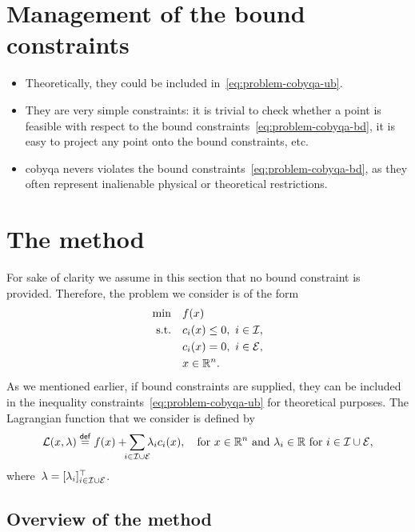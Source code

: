 \section{Management of the bound constraints}

\begin{itemize}
    \item Theoretically, they could be included in~\cref{eq:problem-cobyqa-ub}.
    \item They are very simple constraints: it is trivial to check whether a point is feasible with respect to the bound constraints~\cref{eq:problem-cobyqa-bd}, it is easy to project any point onto the bound constraints, etc.
    \item \gls{cobyqa} nevers violates the bound constraints~\cref{eq:problem-cobyqa-bd}, as they often represent inalienable physical or theoretical restrictions.
\end{itemize}

\section{The  method}

For sake of clarity we assume in this section that no bound constraint is provided.
Therefore, the problem we consider is of the form
\begin{subequations}
    \label{eq:problem-cobyqa-no-bounds}
    \begin{align}
        \min        & \quad f(x)\\
        \text{s.t.} & \quad c_{i}(x) \le 0, ~ i \in \mathcal{I},\\
                    & \quad c_{i}(x) = 0, ~ i \in \mathcal{E},\\
                    & \quad x \in \mathbb{R}^n. \nonumber
    \end{align}
\end{subequations}
As we mentioned earlier, if bound constraints are supplied, they can be included in the inequality constraints~\cref{eq:problem-cobyqa-ub} for theoretical purposes.
The Lagrangian function that we consider is defined by
\begin{equation*}
    \lag(x, \lambda) \eqdef \obj(x) + \sum_{\mathclap{i \in \iub \cup \ieq}} \lambda_i \con{i}(x), \quad \text{for~$x \in \R^n$ and~$\lambda_i \in \R$ for~$i \in \iub \cup \ieq$},
\end{equation*}
where~$\lambda = [\lambda_i]_{i \in \mathcal{I} \cup \mathcal{E}}^{\top}$.

\subsection{Overview of the method}

